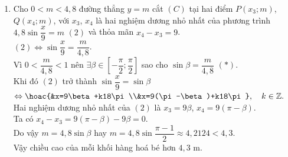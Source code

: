 \begin{ex}
{\begin{enumerate}
			Ta có $y=4{,}8\sin\dfrac{x}{9} \le 4{,}8$ nên đường thẳng $y=3{,}6$ cắt một phần đồ thị của hàm số $y=4{,}8\sin\dfrac{x}{9}$ tại hai  điểm $M\left(x_1;3{,}6\right)$, $N\left(x_2;3{,}6\right)$.\\
			Giải phương trình $4{,}8\sin\dfrac{x}{9}=3{,}6 \Leftrightarrow \sin\dfrac{x}{9} =\dfrac{3}{4}\  (1)$. \\
			 Gọi $x_1$, $x_2$ là hai nghiệm dương nhỏ nhất của $(1)$.\\
			Vì $-1\le \dfrac{3}{4}\le 1$ nên tồn tại một số $\alpha \in \left[-\dfrac{\pi}{2};\dfrac{\pi}{2}\right]$ sao cho $\sin\alpha=\dfrac{3}{4}$.\\ 
			 Ta có $\sin\dfrac{x}{9}=\sin\alpha \Leftrightarrow $
			 $\hoac{&\dfrac{x}{9}=\alpha+k2\pi\\&\dfrac{x}{9}=\pi-\alpha+k2\pi} \Leftrightarrow \hoac{&x=9\alpha+k18\pi\\&x=9\pi-9\alpha+k18\pi.}$\\
			 Do $x_1; x_2\in (0;9\pi)$ nên $x_1 \approx 9\alpha \approx 7{,}6325$; $x_1 \approx 9\pi-9\alpha \approx 20{,}6418$ nên $x_2-x_1<13{,}1$.\\
			Vậy chiều  rộng của khối hàng hoá bé hơn $13{,}1$ m.
			\item Cho $0<m<4{,}8$ đường thẳng $y=m$ cắt $(C)$ tại hai điểm $P\left(x_3;m\right)$, $Q\left(x_4;m\right)$, với $x_3$, $x_4$ là hai nghiệm dương nhỏ nhất của phương trình $4{,}8\sin\dfrac{x}{9}=m$ $(2)$ và thỏa mãn  $x_4-x_3=9$.\\
			$(2) \Leftrightarrow \sin\dfrac{x}{9}=\dfrac{m}{4{,}8}$. \\ 
			Vì  $0<\dfrac{m}{4{,}8}<1$ nên $\exists \beta \in \left[-\dfrac{\pi}{2};\dfrac{\pi}{2} \right]$ sao cho $\sin\beta=\dfrac{m}{4{,}8}$ $(*)$.\\
			 Khi đó $(2)$ trở thành $\sin\dfrac{x}{9}=\sin\beta$
			$ \Leftrightarrow  \hoac{&x=9\beta+k18\pi\\&x=9(\pi-\beta)+k18\pi}, \quad k\in \mathbb{Z}.$\\
			Hai nghiệm dương  nhỏ nhất của $(2)$ là $x_3=9\beta$, $x_4=9(\pi-\beta)$.\\
			Ta có  $x_4-x_3=9(\pi-\beta)-9\beta=0$.\\
			 Do vậy $m=4{,}8\sin\beta$ hay $m=4{,}8\sin\dfrac{\pi-1}{2} \approx 4{,}2124<4{,}3$.\\
			Vậy chiều cao của mỗi khối  hàng hoá bé hơn $4{,}3$ m.
		\end{enumerate}
	} 
\end{ex}

